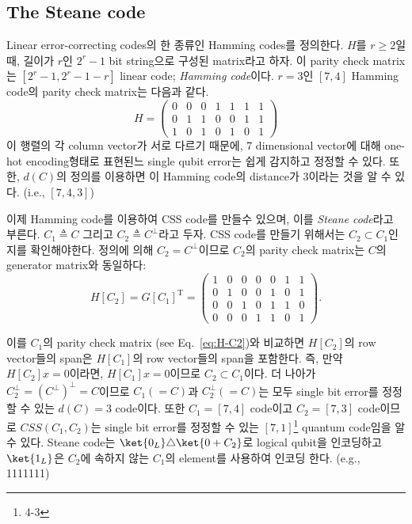 \subsection{The Steane code}
Linear error-correcting codes의 한 종류인 Hamming codes를 정의한다. $H$를 $r \ge 2$일 때, 길이가 $r$인 $2^r-1$ bit string으로 구성된 matrix라고 하자.
이 parity check matrix는 $[2^r-1, 2^r-1-r]$ linear code; \textit{Hamming code}이다. $r = 3$인 $[7, 4]$ Hamming code의 parity check matrix는 다음과 같다.
\begin{equation}
    H=\left(\begin{array}{lllllll}
        0 & 0 & 0 & 1 & 1 & 1 & 1 \\
        0 & 1 & 1 & 0 & 0 & 1 & 1 \\
        1 & 0 & 1 & 0 & 1 & 0 & 1
        \end{array}\right) \label{eq:H-C2}
\end{equation}
이 행렬의 각 column vector가 서로 다르기 때문에, 7 dimensional vector에 대해 one-hot encoding형태로 표현된느 single qubit error는 쉽게 감지하고 정정할 수 있다. 또한, $d(C)$의 정의를 이용하면 이 Hamming code의 distance가 3이라는 것을 알 수 있다. (i.e., $[7, 4, 3]$)

이제 Hamming code를 이용하여 CSS code를 만들수 있으며, 이를 \textit{Steane code}라고 부른다. $C_1 \triangleq C$ 그리고 $C_2 \triangleq C^\perp$라고 두자. CSS code를 만들기 위해서는 $C_2 \subset C_1$인지를 확인해야한다. 
정의에 의해 $C_2 = C^\perp$이므로 $C_2$의 parity check matrix는 $C$의 generator matrix와 동일하다:
\begin{equation*}
    H\left[C_2\right]=G\left[C_1\right]^{\mathrm{T}}=\left(\begin{array}{lllllll}
        1 & 0 & 0 & 0 & 0 & 1 & 1 \\
        0 & 1 & 0 & 0 & 1 & 0 & 1 \\
        0 & 0 & 1 & 0 & 1 & 1 & 0 \\
        0 & 0 & 0 & 1 & 1 & 0 & 1
        \end{array}\right).
\end{equation*}

이를 $C_1$의 parity check matrix (see Eq.~\eqref{eq:H-C2})와 비교하면 $H[C_2]$의 row vector들의 span은 $H[C_1]$의 row vector들의 span을 포함한다. 즉, 만약 $H[C_2] x = 0$이라면, $H[C_1]x = 0$이므로 $C_2 \subset C_1$이다.
더 나아가 $C_2^\perp = (C^\perp)^\perp = C$이므로 $C_1 (=C)$과 $C_2^\perp (=C)$는 모두 single bit error를 정정할 수 있는 $d(C) = 3$ code이다.
또한 $C_1 = [7, 4]$ code이고 $C_2 = [7, 3]$ code이므로 $CSS(C_1, C_2)$는 single bit error를 정정할 수 있는 $[7, 1]$\footnote{4-3} quantum code임을 알 수 있다. 
Steane code는 $\ket{0_L} \triangle \ket{0+C_2}$로 logical qubit을 인코딩하고 $\ket{1_L}$은 $C_2$에 속하지 않는 $C_1$의 element를 사용하여 인코딩 한다. (e.g., 1111111)


